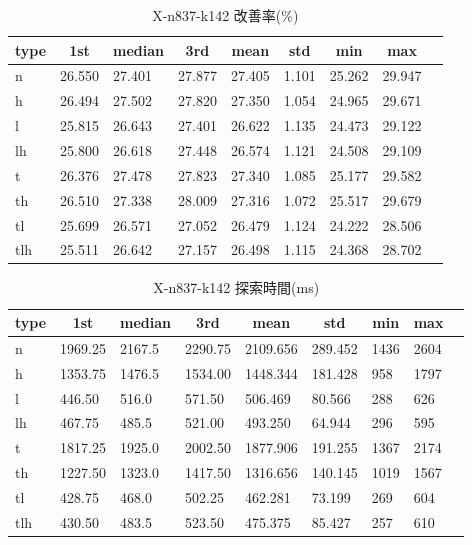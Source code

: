 \begin{table}[htbp]
    \centering
    \caption{X-n837-k142 改善率(\%)}
    \begin{tabular}{|l|l|l|l|l|l|l|l|l|}\hline
    \multicolumn{1}{|c|}{\textbf{type}}
    &\multicolumn{1}{|c|}{\textbf{1st}}
    &\multicolumn{1}{c|}{\textbf{median}}
    &\multicolumn{1}{c|}{\textbf{3rd}}
    &\multicolumn{1}{c|}{\textbf{mean}}
    &\multicolumn{1}{c|}{\textbf{std}}
    &\multicolumn{1}{c|}{\textbf{min}}
    &\multicolumn{1}{c|}{\textbf{max}}\\\hline
	n & 26.550 & 27.401 & 27.877 & 27.405 & 1.101 & 25.262 & 29.947\\\hline
	h & 26.494 & 27.502 & 27.820 & 27.350 & 1.054 & 24.965 & 29.671\\\hline
	l & 25.815 & 26.643 & 27.401 & 26.622 & 1.135 & 24.473 & 29.122\\\hline
	lh & 25.800 & 26.618 & 27.448 & 26.574 & 1.121 & 24.508 & 29.109\\\hline
	t & 26.376 & 27.478 & 27.823 & 27.340 & 1.085 & 25.177 & 29.582\\\hline
	th & 26.510 & 27.338 & 28.009 & 27.316 & 1.072 & 25.517 & 29.679\\\hline
	tl & 25.699 & 26.571 & 27.052 & 26.479 & 1.124 & 24.222 & 28.506\\\hline
	tlh & 25.511 & 26.642 & 27.157 & 26.498 & 1.115 & 24.368 & 28.702\\\hline
	\end{tabular}
\end{table}
\begin{table}[htbp]
    \centering
    \caption{X-n837-k142 探索時間(ms)}
    \begin{tabular}{|l|l|l|l|l|l|l|l|l|}\hline
    \multicolumn{1}{|c|}{\textbf{type}}
    &\multicolumn{1}{|c|}{\textbf{1st}}
    &\multicolumn{1}{c|}{\textbf{median}}
    &\multicolumn{1}{c|}{\textbf{3rd}}
    &\multicolumn{1}{c|}{\textbf{mean}}
    &\multicolumn{1}{c|}{\textbf{std}}
    &\multicolumn{1}{c|}{\textbf{min}}
    &\multicolumn{1}{c|}{\textbf{max}}\\\hline
	n & 1969.25 & 2167.5 & 2290.75 & 2109.656 & 289.452 & 1436 & 2604\\\hline
	h & 1353.75 & 1476.5 & 1534.00 & 1448.344 & 181.428 & 958 & 1797\\\hline
	l & 446.50 & 516.0 & 571.50 & 506.469 & 80.566 & 288 & 626\\\hline
	lh & 467.75 & 485.5 & 521.00 & 493.250 & 64.944 & 296 & 595\\\hline
	t & 1817.25 & 1925.0 & 2002.50 & 1877.906 & 191.255 & 1367 & 2174\\\hline
	th & 1227.50 & 1323.0 & 1417.50 & 1316.656 & 140.145 & 1019 & 1567\\\hline
	tl & 428.75 & 468.0 & 502.25 & 462.281 & 73.199 & 269 & 604\\\hline
	tlh & 430.50 & 483.5 & 523.50 & 475.375 & 85.427 & 257 & 610\\\hline
	\end{tabular}
\end{table}
